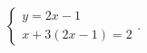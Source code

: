 $\displaystyle
\left\{
\begin{array}{l}
\displaystyle y = 2x - 1 \\
\displaystyle x + 3(2x-1) = 2
\end{array}
\right.
$. %
